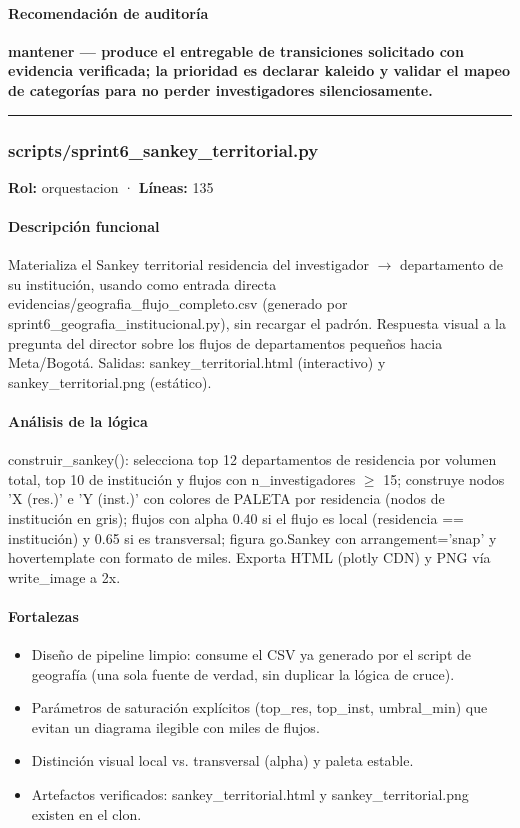 \paragraph{Recomendación de auditoría}
\textbf{mantener --- produce el entregable de transiciones solicitado con evidencia verificada; la prioridad es declarar kaleido y validar el mapeo de categorías para no perder investigadores silenciosamente.}

\medskip
\hrule

\subsubsection{scripts/sprint6\_sankey\_territorial.py}
\textbf{Rol:} orquestacion · \textbf{Líneas:} 135

\paragraph{Descripción funcional}
Materializa el Sankey territorial residencia del investigador $\rightarrow$ departamento de su institución, usando como entrada directa evidencias/geografia\_flujo\_completo.csv (generado por sprint6\_geografia\_institucional.py), sin recargar el padrón. Respuesta visual a la pregunta del director sobre los flujos de departamentos pequeños hacia Meta/Bogotá. Salidas: sankey\_territorial.html (interactivo) y sankey\_territorial.png (estático).

\paragraph{Análisis de la lógica}
construir\_sankey(): selecciona top 12 departamentos de residencia por volumen total, top 10 de institución y flujos con n\_investigadores $\geq$ 15; construye nodos 'X (res.)' e 'Y (inst.)' con colores de PALETA por residencia (nodos de institución en gris); flujos con alpha 0.40 si el flujo es local (residencia == institución) y 0.65 si es transversal; figura go.Sankey con arrangement='snap' y hovertemplate con formato de miles. Exporta HTML (plotly CDN) y PNG vía write\_image a 2x.

\paragraph{Fortalezas}
\begin{itemize}
  \item Diseño de pipeline limpio: consume el CSV ya generado por el script de geografía (una sola fuente de verdad, sin duplicar la lógica de cruce).
  \item Parámetros de saturación explícitos (top\_res, top\_inst, umbral\_min) que evitan un diagrama ilegible con miles de flujos.
  \item Distinción visual local vs. transversal (alpha) y paleta estable.
  \item Artefactos verificados: sankey\_territorial.html y sankey\_territorial.png existen en el clon.
\end{itemize}

